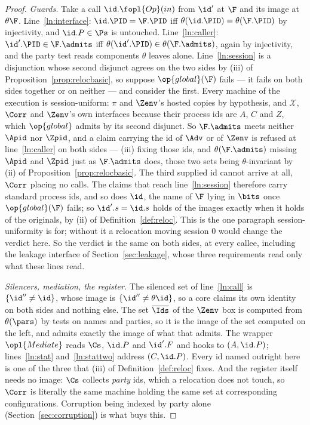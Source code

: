 \documentclass[10pt,oneside,openany]{book}
\theoremstyle{accentdef}
\theoremstyle{accentplain}
\begin{document}
\begin{proof}
\emph{Guards.} Take a call $\id.\fopl{Op}(in)$ from $\id'$ at $\F$ and its image at $\theta\F$.
Line~\ref{ln:interface}: $\id.\PID = \F.\PID$ iff $\theta(\id.\PID) = \theta(\F.\PID)$ by
injectivity, and $\id.P \in \Ps$ is untouched. Line~\ref{ln:caller}: $\id'.\PID \in \F.\admits$ iff
$\theta(\id'.\PID) \in \theta(\F.\admits)$, again by injectivity, and the party test reads
components $\theta$ leaves alone. Line~\ref{ln:session} is a disjunction whose second disjunct agrees
on the two sides by (iii) of Proposition~\ref{prop:relocbasic}, so suppose $\op{global}(\F)$ fails ---
it fails on both sides together or on neither --- and consider the first. Every machine of the
execution is session-uniform: $\pi$ and $\Zenv$'s hosted copies by hypothesis, and $\mathcal{X}$,
$\Corr$ and $\Zenv$'s own interfaces because their process ids are $A$, $C$ and $Z$, which
$\op{global}$ admits by its second disjunct. So $\F.\admits$ meets neither $\Apid$ nor $\Zpid$, and a
claim carrying the id of $\Adv$ or of $\Zenv$ is refused at line~\ref{ln:caller} on both sides --- (iii)
fixing those ids, and $\theta(\F.\admits)$ missing $\Apid$ and $\Zpid$ just as $\F.\admits$ does,
those two sets being $\theta$-invariant by (ii) of Proposition~\ref{prop:relocbasic}. The third
supplied id cannot arrive at all, $\Corr$ placing no calls. The claims that reach
line~\ref{ln:session} therefore carry standard process ids, and so does $\id$, the name of $\F$ lying
in $\bits$ once $\op{global}(\F)$ fails; so $\id'.s = \id.s$
holds of the images exactly when it holds of the originals, by (ii) of Definition~\ref{def:reloc}.
This is the one paragraph session-uniformity is for; without it a relocation moving session $0$ would
change the verdict here. So the
verdict is the same on both sides, at every callee, including the leakage interface of
Section~\ref{sec:leakage}, whose three requirements read only what these lines read.

\emph{Silencers, mediation, the register.} The silenced set of line~\ref{ln:call} is
$\{\id'' \neq \id\}$, whose image is $\{\id'' \neq \theta\id\}$, so a core claims its own identity
on both sides and nothing else. The set $\overline{\Ids}$ of the $\Zenv$ box is computed from
$\theta(\pars)$ by tests on names and parties, so it is the image of the set computed on the left,
and admits exactly the image of what that admits. The wrapper $\opl{Mediate}$ reads $\Cs$, $\id.P$ and
$\id'.F$ and hooks to $(A,\id.P)$; lines~\ref{ln:stat} and~\ref{ln:stattwo} address $(C,\id.P)$.
Every id named outright here is one of the three that (iii) of Definition~\ref{def:reloc} fixes. And
the register itself needs no image:
$\Cs$ collects \emph{party} ids, which a relocation does not touch, so $\Corr$ is literally the
same machine holding the same set at corresponding configurations. Corruption being indexed by
party alone (Section~\ref{sec:corruption}) is what buys this.


\end{proof}
\end{document}

